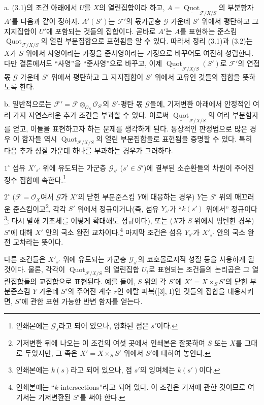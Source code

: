 
\noindent a. (3.1)의 조건 아래에서 $U$를 $X$의 열린집합이라 하고,
$A=\underline{\operatorname{Quot}}_{\mathcal F/X/S}$의 부분함자 $A'$를
다음과 같이 정하자. $A'(S')$는 $\mathcal F'$의 몫가군층 $\mathcal G$
가운데 $S'$ 위에서 평탄하고 그 지지집합이 $U'$에 포함되는 것들의
집합이다. 곧바로 $A'$는 $A$를 표현하는 준스킴
$\operatorname{Quot}_{\mathcal F/X/S}$의 열린 부분집합으로 표현됨을
알 수 있다. 따라서 정리 (3.1)과 (3.2)는
$X$가 $S$ 위에서 사영이라는 가정을 준사영이라는 가정으로 바꾸어도
여전히 성립한다. 다만 결론에서도 ``사영''을 ``준사영''으로 바꾸고,
이제 $\underline{\operatorname{Quot}}_{\mathcal F/X/S}(S')$로
$\mathcal F'$의 연접 몫 $\mathcal G$ 가운데 $S'$ 위에서 평탄하고
그 지지집합이 $S'$ 위에서 고유인 것들의 집합을 뜻하도록 한다.

\medskip
\noindent b. 일반적으로는
$\mathcal F'=\mathcal F\otimes_{\mathcal O_S}\mathcal O_{S'}$의
$S'$-평탄 몫 $\mathcal G$들에, 기저변환 아래에서 안정적인 여러 가지
자연스러운 추가 조건을 부과할 수 있다. 이로써
$\underline{\operatorname{Quot}}_{\mathcal F/X/S}$의 여러 부분함자를
얻고, 이들을 표현하고자 하는 문제를 생각하게 된다. 통상적인 판정법으로
많은 경우 이 함자들 역시 $\operatorname{Quot}_{\mathcal F/X/S}$의
열린 부분집합들로 표현됨을 증명할 수 있다. 특히 다음 추가 성질 가운데
하나를 부과하는 경우가 그러하다.

\smallskip
\noindent $1^\circ$ 섬유 $X'_{s'}$ 위에 유도되는 가군층
$\mathcal G_{s'}$ ($s'\in S'$)에 결부된 소순환들의 차원이 주어진
정수 집합에 속한다.\footnote{인쇄본에는
$\mathcal G_s$라고 되어 있으나, 양화된 점은 $s'$이다.}

\smallskip
\noindent $2^\circ$ ($\mathcal F=\mathcal O_X$여서 $\mathcal G$가
$X'$의 닫힌 부분준스킴 $Y$에 대응하는 경우) $Y$는 $S'$ 위의 매끄러운
준스킴이고\footnote{기저변환 뒤에 나오는 이 조건의
여섯 곳에서 인쇄본은 잘못하여 $S$ 또는 $X$를 그대로 두었지만, 그 족은
$X'=X\times_SS'$ 위에서 $S'$에 대하여 놓인다.}, 각각 $S'$ 위에서
정규이거나(즉, 섬유 $Y_{s'}$가 ``$k(s')$ 위에서''
정규이다\footnote{인쇄본에는 $k(s)$라고 되어 있으나,
점 $s'$의 잉여체는 $k(s')$이다.}; 다시 말해 기초체를 어떻게 확대해도
정규이다), 또는 ($X$가 $S$ 위에서 평탄한 경우) $S'$에 대해 $X'$ 안의
국소 완전 교차이다.\footnote{인쇄본에는
``$k$-intersections''라고 되어 있다. 이 조건은 기저에 관한 것이므로 여기서는 기저변환된 $S'$를 써야 한다.}
마지막 조건은 섬유 $Y_{s'}$가 $X'_{s'}$ 안의 국소 완전 교차라는 뜻이다.

다른 조건들은 $X'_{s'}$ 위에 유도되는 가군층 $\mathcal G_{s'}$의
코호몰로지적 성질 등을 사용하게 될 것이다. 물론, 각각이
$\operatorname{Quot}_{\mathcal F/X/S}$의 열린집합 $U_i$로 표현되는
조건들의 논리곱은 그 열린집합들의 교집합으로 표현된다. 예를 들어,
$S$ 위의 각 $S'$에 $X'=X\times_SS'$의 닫힌 부분준스킴 $Y$ 가운데
$S'$의 주어진 계수 $r$인 에탈 피복([3], I)인 것들의 집합을 대응시키면,
$S'$에 관한 표현 가능한 반변 함자를 얻는다.

